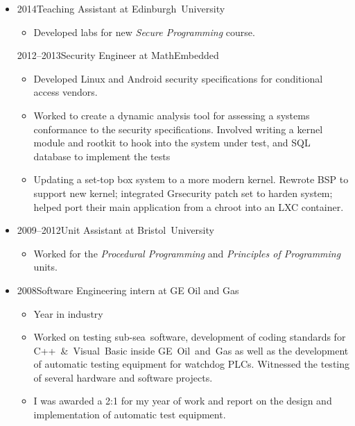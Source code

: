 \documentclass[a4paper,10pt,selectp]{book}
\newcommand{\lowercaps}[1]{\textsc{\MakeLowercase{#1}}}
\newcommand{\sideheading}[1]{\vspace{0.5em}\marginnote[\color{BrickRed}\raggedleft\lowercaps{#1}]{\raggedleft\lowercaps{#1}}}
\newcommand{\listhead}[1]{#1}
\begin{document}
\begin{itemize}
  \item 
    \sideheading{Experience}%
    \listhead{2014\hspace{1em}Teaching Assistant at Edinburgh~University}
    \begin{itemize}
        \item[] Developed labs for new \emph{Secure Programming} course.
    \end{itemize}
    \listhead{2012–2013\hspace{1em}Security Engineer at MathEmbedded}
    \begin{itemize}
      \item[] Developed Linux and Android security specifications for conditional access vendors.  
      \item[] Worked to create a dynamic analysis tool for assessing a systems
	      conformance to the security specifications.  Involved writing a
	      kernel module and rootkit to hook into the system under test, and
	      SQL database to implement the tests
      \item[] Updating a set-top box system to a more modern kernel.  Rewrote
	      BSP to support new kernel; integrated Grsecurity patch set to
	      harden system; helped port their main application from a chroot
	      into an LXC container.
    \end{itemize}

    \item\listhead{2009–2012\hspace{1em}Unit Assistant at Bristol~University}
    \begin{itemize}
      \item[] Worked for the \textit{Procedural Programming} and \textit{Principles of Programming} units.
    \end{itemize}

  \item \listhead{2008\hspace{1em}Software Engineering intern at GE Oil and Gas}
    \begin{itemize}
      \item[] Year in industry
      \item[] Worked on testing sub-sea~software, development of coding
        standards for C++~\&~Visual~Basic inside GE~Oil~and~Gas as well as the
        development of automatic testing equipment for watchdog PLCs.
        Witnessed the testing of several hardware and software
        projects.
      \item[] I was awarded a 2:1 for my year of work and report on the design
        and implementation of automatic test equipment.
    \end{itemize}


\end{itemize}
\end{document}
